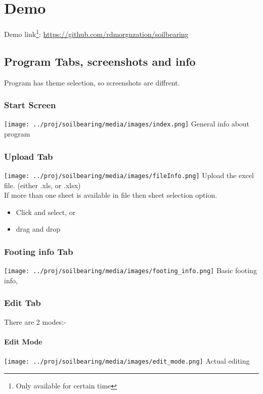 \chapter{Demo}
Demo link\footnote{Only available for certain time}: \url{https://github.com/rdmorgnzation/soilbearing}\\

\section{Program Tabs, screenshots and info}
Program has theme selection, so screenshots are diffrent.\\
\subsection{Start Screen}
\texttt{[image: ../proj/soilbearing/media/images/index.png]}
General info about program\\

\subsection{Upload Tab}
\texttt{[image: ../proj/soilbearing/media/images/fileInfo.png]}
Upload the excel file. (either .xls, or .xlsx)\\
If more than one sheet is available in file then sheet selection option.\\
\begin{itemize}
\item Click and select, or\\
\item drag and drop\\
\end{itemize}

\subsection{Footing info Tab}
\texttt{[image: ../proj/soilbearing/media/images/footing\_info.png]}
Basic footing info,\\

\subsection{Edit Tab}
There are 2 modes:-\\
\subsubsection{Edit Mode}
\texttt{[image: ../proj/soilbearing/media/images/edit\_mode.png]}
Actual editing\\

